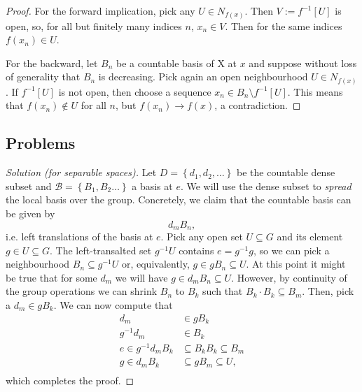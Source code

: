 
\begin{proof} 
    For the forward implication, pick any \( U \in N_{f(x)} \). Then \( V := f^{-1}[U] \) is open, so, for all but finitely many indices \( n \), \( x_n \in V \). Then for the same indices \( f(x_n) \in U \).

    For the backward, let \( B_n \) be a countable basis of X at \( x \) and suppose without loss of generality that \( B_n \) is decreasing. Pick again an open neighbourhood \( U \in N_{f(x)} \). If \( f^{-1}[U] \) is not open, then choose a sequence \( x_n \in B_n \setminus f^{-1}[U] \). This means that \( f(x_n) \not\in U \) for all \( n \), but \( f(x_n) \to f(x) \), a contradiction.
\end{proof}

\subsection{Problems}


\begin{proof}[Solution (for separable spaces)]
    Let \( D = \left\{ d_1, d_2, \ldots \right\} \) be the countable dense subset and \( \mathcal{B} = \left\{ B_1, B_2 \ldots \right\} \) a basis at \( e \). We will use the dense subset to \emph{spread} the local basis over the group. Concretely, we claim that the countable basis can be given by
    \[ 
       d_m B_n,
   \]
   i.e. left translations of the basis at \( e \). Pick any open set \( U \subseteq G \) and its element \( g \in U \subseteq G \). The left-transalted set \( g^{-1}U \) contains \( e = g^{-1}g \), so we can pick a neighbourhood \( B_n \subseteq g^{-1}U \) or, equivalently, \( g \in gB_n \subseteq U \).
   At this point it might be true that for some \( d_m \) we will have \( g \in d_mB_n \subseteq U \). However, by continuity of the group operations we can shrink \( B_n \) to \( B_k \) such that \( B_k \cdot B_k \subseteq B_m \). Then, pick a \( d_m \in gB_k \). We can now compute that
\begin{align*}
    d_m &\in gB_k  \\
    g^{-1}d_m &\in B_k \\
    e \in g^{-1}d_mB_k &\subseteq B_kB_k \subseteq B_m \\
    g \in d_mB_k &\subseteq gB_m \subseteq U, \\
\end{align*}
which completes the proof.
\end{proof}

